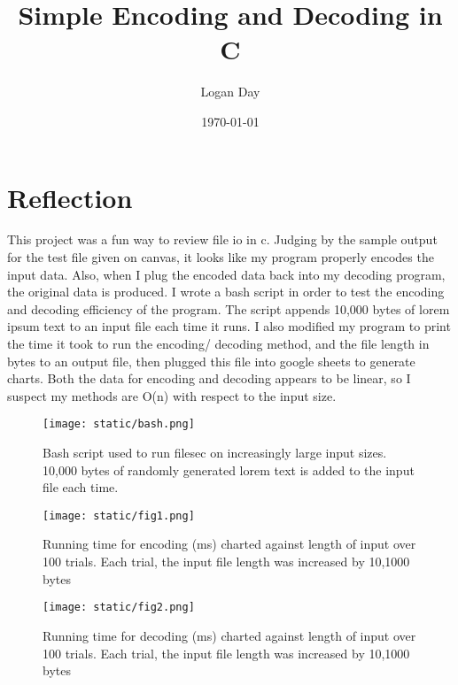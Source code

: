 \documentclass{article}
\title{Simple Encoding and Decoding in C}
\author{Logan Day}
\date{\today}
\begin{document}
\maketitle

\section{Reflection}
This project was a fun way to review file io in c. Judging by the sample output
for the test file given on canvas, it looks like my program properly encodes the
input data. Also, when I plug the encoded data back into my decoding program,
the original data is produced. I wrote a bash script in order to test the 
encoding and decoding efficiency of the program. The script appends 10,000
bytes of lorem ipsum text to an input file each time it runs. I also modified
my program to print the time it took to run the encoding/ decoding method, and the
file length in bytes to an output file, then plugged this file into google sheets
to generate charts. Both the data for encoding and decoding appears to be linear,
so I suspect my methods are O(n) with respect to the input size. 

\begin{figure}
  \texttt{[image: static/bash.png]}
  \caption{Bash script used to run filesec on increasingly large input sizes. 10,000 bytes of
  randomly generated lorem text is added to the input file each time.}
  \label{fig:bash_script}
\end{figure}

\begin{figure}
  \texttt{[image: static/fig1.png]}
  \caption{Running time for encoding (ms) charted against length of input over 100 trials.
  Each trial, the input file length was increased by 10,1000 bytes}
  \label{fig:encode}
\end{figure}

\begin{figure}
  \texttt{[image: static/fig2.png]}
  \caption{Running time for decoding (ms) charted against length of input over 100 trials.
  Each trial, the input file length was increased by 10,1000 bytes}
  \label{fig:decode}
\end{figure}

    
\end{document}
